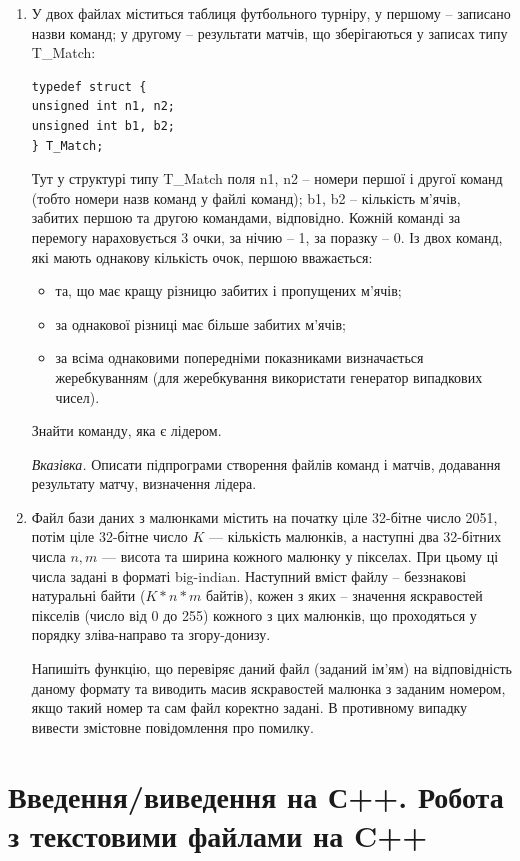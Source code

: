 \documentclass[a5paper,titlepage,openany,twoside,draft]{book_unv}%
\begin{document}
\begin{enumerate}
\def\labelenumi{\arabic{enumi})}
\setcounter{enumi}{11}
\item
  У двох файлах міститься таблиця футбольного турніру, у першому --
  записано назви команд; у другому -- результати матчів, що зберігаються
  у записах типу T\_Match:
\begin{verbatim}
typedef struct {
unsigned int n1, n2;
unsigned int b1, b2;
} T_Match;
\end{verbatim}
Тут у структурі типу T\_Match поля n1, n2 -- номери першої і другої 
команд (тобто номери назв команд у файлі команд); b1, b2 -- кількість
м'ячів, забитих першою та другою командами, відповідно.
Кожній команді за перемогу нараховується 3 очки, за нічию -- 1, за
поразку -- 0.
Із двох команд, які мають однакову кількість очок, першою вважається:
\begin{itemize}
\item
та, що має кращу різницю забитих і пропущених м'ячів;
\item
за однакової різниці має більше забитих м'ячів;
\item
за всіма однаковими попередніми показниками визначається жеребкуванням
(для жеребкування використати генератор випадкових чисел).
\end{itemize}
Знайти команду, яка є лідером.

\emph{Вказівка.} Описати підпрограми створення файлів команд і матчів, 
додавання результату матчу, визначення лідера.

\item
Файл бази даних з малюнками містить на початку ціле 32-бітне число
2051, потім ціле 32-бітне число $K$ --- кількість малюнків, а наступні два
32-бітних числа $n,m$ --- висота та ширина кожного малюнку у
пікселах. При цьому ці числа задані в форматі big-indian.
Наступний вміст файлу -- беззнакові натуральні байти ($K*n*m$ байтів),
кожен з яких -- значення яскравостей пікселів (число від 0 до 255)
кожного з цих малюнків, що проходяться у порядку зліва-направо та
згору-донизу.

Напишіть функцію, що перевіряє даний файл (заданий ім'ям) на
відповідність даному формату та виводить масив яскравостей малюнка з
заданим номером, якщо такий номер та сам файл коректно задані. В
противному випадку вивести змістовне повідомлення про помилку.

\end{enumerate}


\chapter{Введення/виведення на С++. Робота з текстовими файлами на C++}
%
\end{document}
